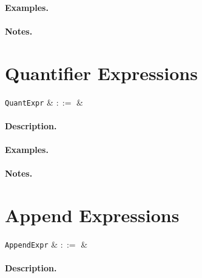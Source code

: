 \paragraph{Examples.}

\paragraph{Notes.} 


\section{Quantifier Expressions}

\begin{syntax}
  \verb+QuantExpr+ & $::=$ &\\
\end{syntax}

\paragraph{Description.}

\paragraph{Examples.}

\paragraph{Notes.} 


\section{Append Expressions}

\begin{syntax}
  \verb+AppendExpr+ & $::=$ &\\
\end{syntax}

\paragraph{Description.}

